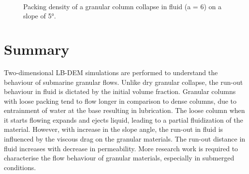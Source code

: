 \begin{figure}
\\
\caption{Packing density of a granular column collapse in fluid (a = 6) on a 
slope of 5\si{\degree}.}
\label{fig:a6_slope_voro}
\end{figure}

\section{Summary}

Two-dimensional LB-DEM simulations are performed to understand the behaviour 
of submarine granular flows. Unlike dry granular collapse, the run-out 
behaviour in fluid is dictated by the initial volume fraction. Granular columns 
with loose packing tend to flow longer in comparison to dense columns, due to 
entrainment of water at the base resulting in lubrication. The loose column 
when it starts flowing expands and ejects liquid, leading to a partial 
fluidization of the material. However, with increase in the slope angle, the 
run-out in fluid is influenced by the viscous drag on the granular materials. 
The run-out distance in fluid increases with decrease in permeability. More 
research work is required to characterise the flow behaviour of granular 
materials, especially in submerged conditions.
